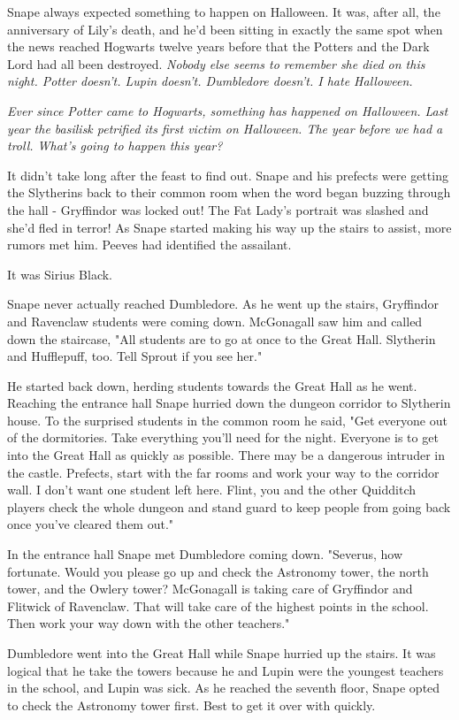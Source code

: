 Snape always expected something to happen on Halloween. It was, after all, the anniversary of Lily's death, and he'd been sitting in exactly the same spot when the news reached Hogwarts twelve years before that the Potters and the Dark Lord had all been destroyed. \emph{Nobody else seems to remember she died on this night. Potter doesn't. Lupin doesn't. Dumbledore doesn't. I hate Halloween.}

\emph{Ever since Potter came to Hogwarts, something has happened on Halloween. Last year the basilisk petrified its first victim on Halloween. The year before we had a troll. What's going to happen this year?}

It didn't take long after the feast to find out. Snape and his prefects were getting the Slytherins back to their common room when the word began buzzing through the hall - Gryffindor was locked out! The Fat Lady's portrait was slashed and she'd fled in terror! As Snape started making his way up the stairs to assist, more rumors met him. Peeves had identified the assailant.

It was Sirius Black.

Snape never actually reached Dumbledore. As he went up the stairs, Gryffindor and Ravenclaw students were coming down. McGonagall saw him and called down the staircase, "All students are to go at once to the Great Hall. Slytherin and Hufflepuff, too. Tell Sprout if you see her."

He started back down, herding students towards the Great Hall as he went. Reaching the entrance hall Snape hurried down the dungeon corridor to Slytherin house. To the surprised students in the common room he said, "Get everyone out of the dormitories. Take everything you'll need for the night. Everyone is to get into the Great Hall as quickly as possible. There may be a dangerous intruder in the castle. Prefects, start with the far rooms and work your way to the corridor wall. I don't want one student left here. Flint, you and the other Quidditch players check the whole dungeon and stand guard to keep people from going back once you've cleared them out."

In the entrance hall Snape met Dumbledore coming down. "Severus, how fortunate. Would you please go up and check the Astronomy tower, the north tower, and the Owlery tower? McGonagall is taking care of Gryffindor and Flitwick of Ravenclaw. That will take care of the highest points in the school. Then work your way down with the other teachers."

Dumbledore went into the Great Hall while Snape hurried up the stairs. It was logical that he take the towers because he and Lupin were the youngest teachers in the school, and Lupin was sick. As he reached the seventh floor, Snape opted to check the Astronomy tower first. Best to get it over with quickly.

